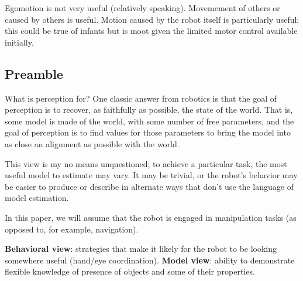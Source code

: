 Egomotion is not very useful (relatively speaking).  Movemement of
others or caused by others is useful.  Motion caused by the robot
itself is particularly useful; this could be true of infants but is
moot given the limited motor control available initially.

\subsection{Preamble}

What is perception for?  One classic answer from robotics is that the
goal of perception is to recover, as faithfully as possible, the state
of the world.  That is, some model is made of the world, with some
number of free parameters, and the goal of perception is to find
values for those parameters to bring the model into as close an
alignment as possible with the world.

This view is my no means unquestioned; to achieve a particular
task, the most useful model to estimate may vary.  It may be
trivial, or the robot's behavior may be easier to produce or
describe in alternate ways that don't use the language of
model estimation.

In this paper, we will assume that the robot is engaged
in manipulation tasks (as opposed to, for example, navigation).

{\bf Behavioral view}: strategies that make it likely for the robot
to be looking somewhere useful (hand/eye coordination).
{\bf Model view}: ability to demonstrate flexible knowledge of presence of 
objects and some of their properties.


